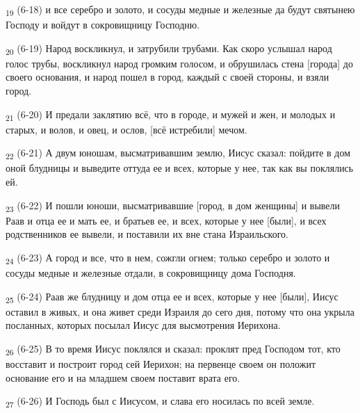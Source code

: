 \begin{tcolorbox}
\textsubscript{19} (6-18) и все серебро и золото, и сосуды медные и железные да будут святынею Господу и войдут в сокровищницу Господню.
\end{tcolorbox}
\begin{tcolorbox}
\textsubscript{20} (6-19) Народ воскликнул, и затрубили трубами. Как скоро услышал народ голос трубы, воскликнул народ громким голосом, и обрушилась стена [города] до своего основания, и народ пошел в город, каждый с своей стороны, и взяли город.
\end{tcolorbox}
\begin{tcolorbox}
\textsubscript{21} (6-20) И предали заклятию всё, что в городе, и мужей и жен, и молодых и старых, и волов, и овец, и ослов, [всё истребили] мечом.
\end{tcolorbox}
\begin{tcolorbox}
\textsubscript{22} (6-21) А двум юношам, высматривавшим землю, Иисус сказал: пойдите в дом оной блудницы и выведите оттуда ее и всех, которые у нее, так как вы поклялись ей.
\end{tcolorbox}
\begin{tcolorbox}
\textsubscript{23} (6-22) И пошли юноши, высматривавшие [город, в дом женщины] и вывели Раав и отца ее и мать ее, и братьев ее, и всех, которые у нее [были], и всех родственников ее вывели, и поставили их вне стана Израильского.
\end{tcolorbox}
\begin{tcolorbox}
\textsubscript{24} (6-23) А город и все, что в нем, сожгли огнем; только серебро и золото и сосуды медные и железные отдали, в сокровищницу дома Господня.
\end{tcolorbox}
\begin{tcolorbox}
\textsubscript{25} (6-24) Раав же блудницу и дом отца ее и всех, которые у нее [были], Иисус оставил в живых, и она живет среди Израиля до сего дня, потому что она укрыла посланных, которых посылал Иисус для высмотрения Иерихона.
\end{tcolorbox}
\begin{tcolorbox}
\textsubscript{26} (6-25) В то время Иисус поклялся и сказал: проклят пред Господом тот, кто восставит и построит город сей Иерихон; на первенце своем он положит основание его и на младшем своем поставит врата его.
\end{tcolorbox}
\begin{tcolorbox}
\textsubscript{27} (6-26) И Господь был с Иисусом, и слава его носилась по всей земле.
\end{tcolorbox}
